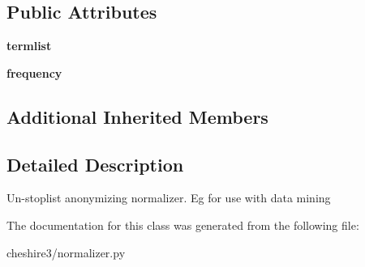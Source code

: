\subsection*{Public Attributes}
\begin{DoxyCompactItemize}
\item 
\hypertarget{classcheshire3_1_1normalizer_1_1_term_exists_normalizer_ab8371cf56bda8ad29d3a503a19b91047}{{\bfseries termlist}}\label{classcheshire3_1_1normalizer_1_1_term_exists_normalizer_ab8371cf56bda8ad29d3a503a19b91047}

\item 
\hypertarget{classcheshire3_1_1normalizer_1_1_term_exists_normalizer_acef464f6dd1d5b377d881d4adefe9db4}{{\bfseries frequency}}\label{classcheshire3_1_1normalizer_1_1_term_exists_normalizer_acef464f6dd1d5b377d881d4adefe9db4}

\end{DoxyCompactItemize}
\subsection*{Additional Inherited Members}


\subsection{Detailed Description}
\begin{DoxyVerb}Un-stoplist anonymizing normalizer. Eg for use with data mining \end{DoxyVerb}
 

The documentation for this class was generated from the following file\-:\begin{DoxyCompactItemize}
\item 
cheshire3/normalizer.\-py\end{DoxyCompactItemize}
